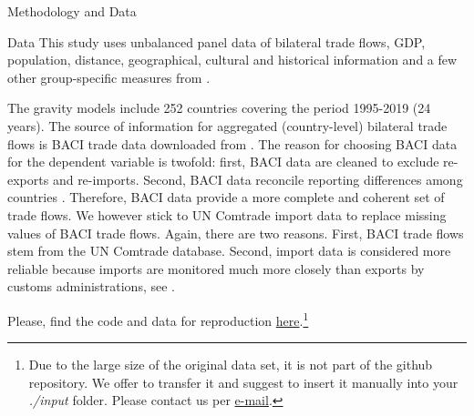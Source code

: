 \begin{section}{Methodology and Data }
\begin{subsection}{Data}
This study uses unbalanced panel data of bilateral trade flows, GDP, population, distance, geographical, cultural and historical information and a few other group-specific measures from \cite{cepii-data_2022}.

The gravity models include 252 countries covering the period 1995-2019 (24 years). The source of information for aggregated (country-level) bilateral trade flows is BACI trade data downloaded from \cite{cepii-data_2022}. The reason for choosing BACI data for the dependent variable is twofold: first, BACI data are cleaned to exclude re-exports and re-imports. Second, BACI data reconcile reporting differences among countries \cite{gaulier2010baci}. Therefore, BACI data provide a more complete and coherent set of trade flows. We however stick to UN Comtrade import data to replace missing values of BACI trade flows. Again, there are two reasons. First, BACI trade flows stem from the UN Comtrade database. Second, import data is considered more reliable because imports are monitored much more closely than exports by customs administrations, see \cite{ypl_2016}.

Please, find the code and data for reproduction \href{https://github.com/gerodasbach/data_repository_RIA_report.git}{here}.\footnote{Due to the large size of the original data set, it is not part of the github repository. We offer to transfer it and suggest to insert it manually into your \textit{./input} folder. Please contact us per \href{mailto:gero.dasbach@gmail.com}{e-mail}.}

\end{subsection}
\end{section}
